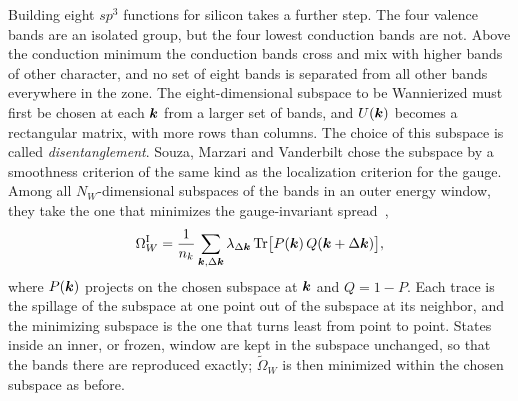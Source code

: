 Building eight $sp^3$ functions for silicon takes a further step. The four valence bands are an isolated group, but the four lowest conduction bands are not. Above the conduction minimum the conduction bands cross and mix with higher bands of other character, and no set of eight bands is separated from all other bands everywhere in the zone. The eight-dimensional subspace to be Wannierized must first be chosen at each $\bm{k}$ from a larger set of bands, and $U(\bm{k})$ becomes a rectangular matrix, with more rows than columns. The choice of this subspace is called \emph{disentanglement}. Souza, Marzari and Vanderbilt chose the subspace by a smoothness criterion of the same kind as the localization criterion for the gauge. Among all $N_W$-dimensional subspaces of the bands in an outer energy window, they take the one that minimizes the gauge-invariant spread~\cite[Eqs.~(8) and (9)]{souza2001maximally},
\begin{equation}
  \Omega_W^{\mathrm{I}} = \frac{1}{n_k}\sum_{\bm{k},\Delta\bm{k}}\lambda_{\Delta\bm{k}}\,\mathrm{Tr}\bigl[P(\bm{k})\,Q(\bm{k} + \Delta\bm{k})\bigr],
  \label{eq:3.6-spillage}
\end{equation}
where $P(\bm{k})$ projects on the chosen subspace at $\bm{k}$ and $Q = 1 - P$. Each trace is the spillage of the subspace at one point out of the subspace at its neighbor, and the minimizing subspace is the one that turns least from point to point. States inside an inner, or frozen, window are kept in the subspace unchanged, so that the bands there are reproduced exactly; $\tilde\Omega_W$ is then minimized within the chosen subspace as before. 

